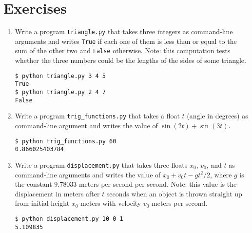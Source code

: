 \documentclass[8pt,a4paper,compress]{beamer}
\begin{document}
\section{Exercises}
\begin{frame}[fragile]
\begin{enumerate}
\item Write a program \lstinline{triangle.py} that takes three integers as command-line arguments and writes \lstinline{True} if each one of them is less than or equal to the sum of the other two and \lstinline{False} otherwise. Note: this computation tests whether the three numbers could be the lengths of the sides of some triangle. 
\begin{lstlisting}[language={}]
$ python triangle.py 3 4 5
True
$ python triangle.py 2 4 7
False
\end{lstlisting}

\item Write a program \lstinline{trig_functions.py} that takes a float $t$ (angle in degrees) as command-line argument and writes the value of $\sin(2t)+\sin(3t)$.
\begin{lstlisting}[language={}]
$ python trig_functions.py 60
0.866025403784
\end{lstlisting}

\item Write a program \lstinline{displacement.py} that takes three floats $x_0$, $v_0$, and $t$ as command-line arguments and writes the value of $x_0+v_0t-gt^2/2$, where $g$ is the constant 9.78033 meters per second per second. Note: this value is the displacement in meters after $t$ seconds when an object is thrown straight up from initial height $x_0$ meters with velocity $v_0$ meters per second.
\begin{lstlisting}[language={}]
$ python displacement.py 10 0 1
5.109835
\end{lstlisting}
\end{enumerate}
\end{frame}
\end{document}
